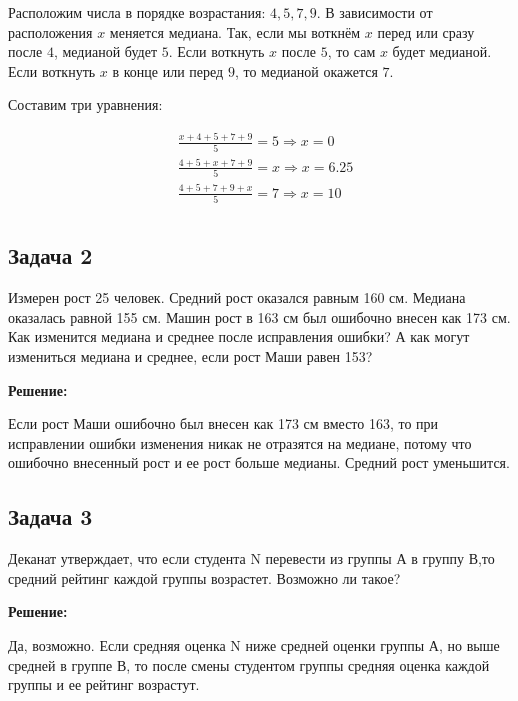 \documentclass[12pt, a4paper, oneside]{article}
\begin{document}
 Расположим числа в порядке возрастания: $4,5,7,9$. В зависимости от расположения $x$ меняется медиана. Так, если мы воткнём $x$ перед или сразу после $4$, медианой будет $5$. Если воткнуть $x$ после $5$, то сам $x$ будет медианой. Если воткнуть $x$ в конце или перед $9$, то медианой окажется $7$. 
 
 Составим три уравнения: 
 
\begin{equation*} 
\begin{aligned}
	& \frac{x + 4 + 5 + 7 + 9}{5} = 5 \Rightarrow x = 0 \\
	& \frac{4 + 5 + x + 7 + 9}{5} = x \Rightarrow x = 6.25 \\
	& \frac{4 + 5 + 7 + 9 + x}{5} = 7 \Rightarrow x = 10 \\
\end{aligned}
\end{equation*}




\subsection*{Задача 2}

Измерен рост 25 человек. Средний рост оказался равным 160 см. Медиана оказалась равной 155 см. Машин рост в 163 см был ошибочно внесен как 173 см. Как изменится медиана и среднее после исправления ошибки? А как могут измениться медиана и среднее, если рост Маши равен 153?

 \textbf{Решение:} 

Если рост Маши ошибочно был внесен как 173 см вместо 163, то при исправлении ошибки изменения никак не отразятся на медиане, потому что ошибочно внесенный рост и ее рост больше медианы. Средний рост уменьшится.


\subsection*{Задача 3}

Деканат утверждает, что если студента N перевести из группы А в группу В,то средний рейтинг каждой группы возрастет. Возможно ли такое?

 \textbf{Решение:} 

Да, возможно. Если средняя оценка N ниже средней оценки группы А, но выше средней в группе В, то после смены студентом группы средняя оценка каждой группы и ее рейтинг возрастут.
\end{document}
